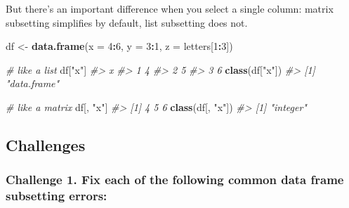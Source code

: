 \documentclass[]{book}
\newenvironment{Shaded}{\begin{snugshade}}{\end{snugshade}}
\newcommand{\KeywordTok}[1]{\textcolor[rgb]{0.13,0.29,0.53}{\textbf{#1}}}
\newcommand{\DataTypeTok}[1]{\textcolor[rgb]{0.13,0.29,0.53}{#1}}
\newcommand{\DecValTok}[1]{\textcolor[rgb]{0.00,0.00,0.81}{#1}}
\newcommand{\StringTok}[1]{\textcolor[rgb]{0.31,0.60,0.02}{#1}}
\newcommand{\CommentTok}[1]{\textcolor[rgb]{0.56,0.35,0.01}{\textit{#1}}}
\newcommand{\OperatorTok}[1]{\textcolor[rgb]{0.81,0.36,0.00}{\textbf{#1}}}
\newcommand{\NormalTok}[1]{#1}
\begin{document}
But there's an important difference when you select a single column:
matrix subsetting simplifies by default, list subsetting does not.

\begin{Shaded}
\begin{Highlighting}[]
\NormalTok{df <-}\StringTok{ }\KeywordTok{data.frame}\NormalTok{(}\DataTypeTok{x =} \DecValTok{4}\OperatorTok{:}\DecValTok{6}\NormalTok{, }\DataTypeTok{y =} \DecValTok{3}\OperatorTok{:}\DecValTok{1}\NormalTok{, }\DataTypeTok{z =}\NormalTok{ letters[}\DecValTok{1}\OperatorTok{:}\DecValTok{3}\NormalTok{])}

\CommentTok{# like a list}
\NormalTok{df[}\StringTok{"x"}\NormalTok{]}
\CommentTok{#>   x}
\CommentTok{#> 1 4}
\CommentTok{#> 2 5}
\CommentTok{#> 3 6}
\KeywordTok{class}\NormalTok{(df[}\StringTok{"x"}\NormalTok{])}
\CommentTok{#> [1] "data.frame"}

\CommentTok{# like a matrix}
\NormalTok{df[, }\StringTok{"x"}\NormalTok{]}
\CommentTok{#> [1] 4 5 6}
\KeywordTok{class}\NormalTok{(df[, }\StringTok{"x"}\NormalTok{])}
\CommentTok{#> [1] "integer"}
\end{Highlighting}
\end{Shaded}

\subsection{Challenges}\label{challenges-9}

\subsubsection*{Challenge 1. Fix each of the following common data frame
subsetting
errors:}\label{challenge-1.-fix-each-of-the-following-common-data-frame-subsetting-errors}

\begin{Shaded}
\end{Shaded}
\end{document}
